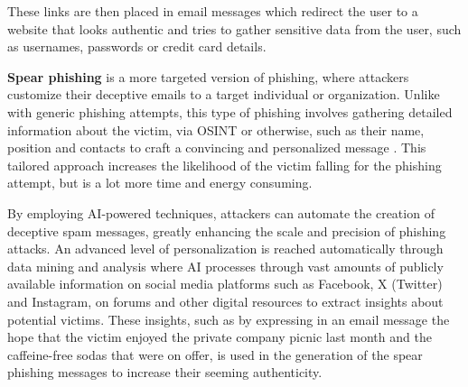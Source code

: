 These links are then placed in email messages which redirect the user to a website that looks authentic and tries to gather sensitive data from the user, such as usernames, passwords or credit card details.

\begin{comment}

Table \ref{tab:placeholder_label} presents a sample, legitimate URL and a non-functional URL used for phishing purposes. The target user is hoped by the attacker to be unaware of the different domains these seemingly similar URL's redirect the user. The phishing URL is taken from a dataset of known phishing websites but its domain is changed to IANA's example.com domain for security. The legitimate URL is from PayPal's website and is functional as of writing.

\begin{table}[h]
    \centering
    \begin{tabular}{|l|l|}
        \hline
        \textbf{Legitimate} & \textbf{Phishing} \\ \hline
        paypal.com/us/signin &paypal.com.cgi-bin.788a5.example.com \\ \hline
        login.ibm.com & login.lbm.example.com \\ \hline
        
    \end{tabular}
    \caption{Examples of legitimate URL's and non-working phishing URL's.}
    \label{tab:placeholder_label}
\end{table}

\end{comment}

\textbf{Spear phishing} is a more targeted version of phishing, where attackers customize their deceptive emails to a target individual or organization. Unlike with generic phishing attempts, this type of phishing involves gathering detailed information about the victim, via OSINT or otherwise, such as their name, position and contacts to craft a convincing and personalized message \citep{salahdineSocialEngineeringAttacks2019}. This tailored approach increases the likelihood of the victim falling for the phishing attempt, but is a lot more time and energy consuming.

By employing AI-powered techniques, attackers can automate the creation of deceptive spam messages, greatly enhancing the scale and precision of phishing attacks. An advanced level of personalization is reached automatically through data mining and analysis where AI processes through vast amounts of publicly available information on social media platforms such as Facebook, X (Twitter) and Instagram, on forums and other digital resources to extract insights about potential victims. These insights, such as by expressing in an email message the hope that the victim enjoyed the private company picnic last month and the caffeine-free sodas that were on offer, is used in the generation of the spear phishing messages to increase their seeming authenticity.



